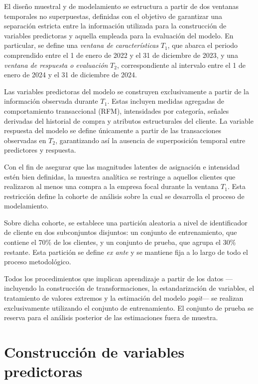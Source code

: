     El diseño muestral y de modelamiento se estructura a partir de dos ventanas temporales no superpuestas, definidas con el objetivo de garantizar una separación estricta entre la información utilizada para la construcción de variables predictoras y aquella empleada para la evaluación del modelo. En particular, se define una \emph{ventana de características} \(T_{1}\), que abarca el periodo comprendido entre el 1 de enero de 2022 y el 31 de diciembre de 2023, y una \emph{ventana de respuesta o evaluación} \(T_{2}\), correspondiente al intervalo entre el 1 de enero de 2024 y el 31 de diciembre de 2024.
    
    Las variables predictoras del modelo se construyen exclusivamente a partir de la información observada durante \(T_{1}\). Estas incluyen medidas agregadas de comportamiento transaccional (RFM), intensidades por categoría, señales derivadas del historial de compra y atributos estructurales del cliente. La variable respuesta del modelo se define únicamente a partir de las transacciones observadas en \(T_{2}\), garantizando así la ausencia de superposición temporal entre predictores y respuesta.
    
    Con el fin de asegurar que las magnitudes latentes de asignación e intensidad estén bien definidas, la muestra analítica se restringe a aquellos clientes que realizaron al menos una compra a la empresa focal durante la ventana \(T_{1}\). Esta restricción define la cohorte de análisis sobre la cual se desarrolla el proceso de modelamiento.
    
    Sobre dicha cohorte, se establece una partición aleatoria a nivel de identificador de cliente en dos subconjuntos disjuntos: un conjunto de entrenamiento, que contiene el 70\% de los clientes, y un conjunto de prueba, que agrupa el 30\% restante. Esta partición se define \emph{ex ante} y se mantiene fija a lo largo de todo el proceso metodológico.
    
    Todos los procedimientos que implican aprendizaje a partir de los datos —incluyendo la construcción de transformaciones, la estandarización de variables, el tratamiento de valores extremos y la estimación del modelo \emph{pogit}— se realizan exclusivamente utilizando el conjunto de entrenamiento. El conjunto de prueba se reserva para el análisis posterior de las estimaciones fuera de muestra.
    
\section{Construcción de variables predictoras}

